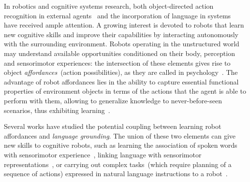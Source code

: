 In robotics and cognitive systems research, both object-directed action recognition in external agents~\cite{koppula:2013:ijrr} and the incorporation of language in \hr{} systems~\cite{harnad:1990,matuszek:2014:aaai} have received ample attention.
A growing interest is devoted to robots that learn new cognitive skills and improve their capabilities by interacting autonomously with the surrounding environment.
Robots operating in the unstructured world may understand available opportunities conditioned on their body, perception and sensorimotor experiences: the intersection of these elements gives rise to object \emph{affordances}~(action possibilities), as they are called in psychology~\cite{gibson:2014}.
The advantage of robot affordances lies in the ability to capture essential functional properties of environment objects in terms of the actions that the agent is able to perform with them, allowing to generalize knowledge to never-before-seen scenarios, thus exhibiting learning~\cite{montesano:2008,jamone:2016:tcds}.


Several works have studied the potential coupling between learning robot affordances and \emph{language grounding}.
The union of these two elements can give new skills to cognitive robots, such as learning the association of spoken words with sensorimotor experience~\cite{salvi:2012:smcb,morse:2016:cogsci}, linking language with sensorimotor representations~\cite{stramandinoli:2016:icdl},%
or carrying out complex %
tasks~(which require planning of a sequence of actions) expressed in natural language instructions to a robot~\cite{antunes:2016:icra}.

